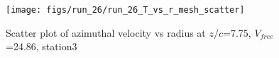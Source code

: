\begin{figure}[H]
\centering
\texttt{[image: figs/run\_26/run\_26\_T\_vs\_r\_mesh\_scatter]}
\caption{Scatter plot of azimuthal velocity vs radius at $z/c$=7.75, $V_{free}$=24.86, station3}
\label{fig:run_26_T_vs_r_mesh_scatter}
\end{figure}


